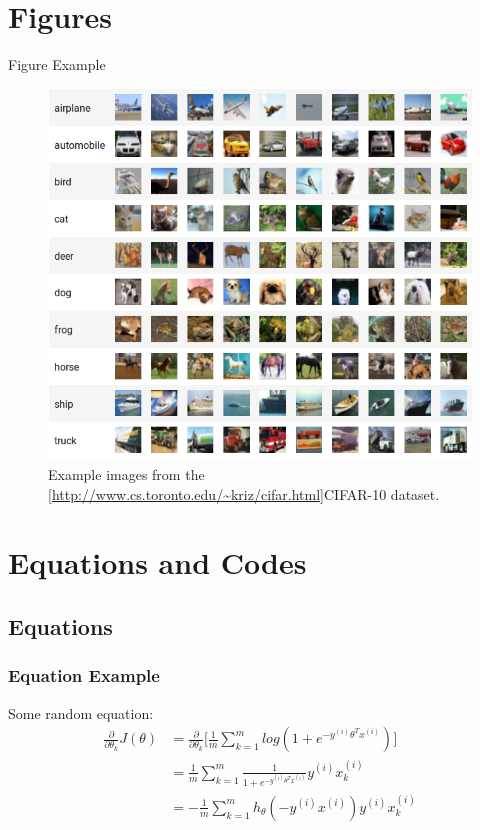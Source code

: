 \documentclass{presentation-beamer}
\begin{document}
\section{Figures}

\begin{frame}{Figure Example} 

\begin{figure}
\centering
\includegraphics[scale=0.25]{cifar10.png}
\caption{Example images from the \cref{http://www.cs.toronto.edu/~kriz/cifar.html}{CIFAR-10} dataset.}
\end{figure}

\end{frame}

\section{Equations and Codes}
\subsection{Equations}
\begin{frame}
\frametitle{Equation Example}

\begin{block}{Some random equation:}
\begin{align*}
    \frac{\partial}{\partial \theta_k}J(\theta) 
        &= \frac{\partial}{\partial \theta_k}\Bigg[\frac{1}{m}\sum_{k=1}^m log(1+e^{-y^{(i)}\theta^Tx^{(i)}})\Bigg] \\
        &= \frac{1}{m}\sum_{k=1}^m \frac{1}{1+e^{-y^{(i)}\theta^Tx^{(i)}}}y^{(i)}x_k^{(i)} \\
        &= -\frac{1}{m}\sum_{k=1}^m h_\theta(-y^{(i)}x^{(i)})y^{(i)}x_k^{(i)}        
\end{align*}
\end{block}

\end{frame}
\end{document}
